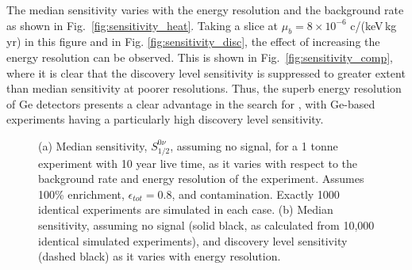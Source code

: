 The median sensitivity varies with the energy resolution and the background rate as shown in Fig.~\ref{fig:sensitivity_heat}. Taking a slice at $\mu_b = 8 \times 10^{-6}$ c/(keV\,kg\,yr) in this figure and in Fig. \ref{fig:sensitivity_disc}, the effect of increasing the energy resolution can be observed. This is shown in Fig.~\ref{fig:sensitivity_comp}, where it is clear that the discovery level sensitivity is suppressed to greater extent than median sensitivity at poorer resolutions. Thus, the superb energy resolution of Ge detectors presents a clear advantage in the search for \novbb{}, with Ge-based experiments having a particularly high discovery level sensitivity.
\begin{figure}[H]
	\centering
	\caption{(a) Median sensitivity, $S^{0\nu}_{1/2}$, assuming no signal, for a 1 tonne \geEn{} experiment with 10 year live time, as it varies with respect to the background rate and energy resolution of the experiment. Assumes 100\% enrichment, $\epsilon_{tot} = 0.8$, and \twovbb{} contamination. Exactly 1000 identical experiments are simulated in each case. (b) Median sensitivity, assuming no signal (solid black, as calculated from 10,000 identical simulated experiments), and discovery level sensitivity (dashed black) as it varies with energy resolution.} 
	\label{fig:sensitivity}
\end{figure}

